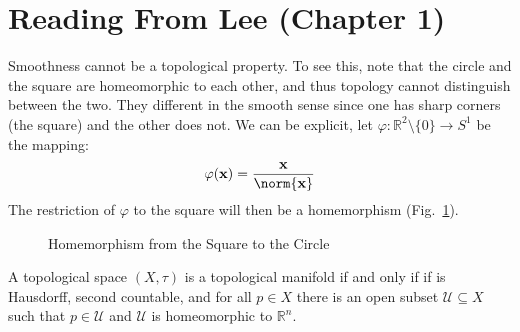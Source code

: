\section{Reading From Lee (Chapter 1)}
        Smoothness cannot be a topological property. To see this, note that the
        circle and the square are homeomorphic to each other, and thus topology
        cannot distinguish between the two. They different in the smooth sense
        since one has sharp corners (the square) and the other does not. We can
        be explicit, let
        $\varphi:\mathbb{R}^{2}\setminus\{0\}\rightarrow{S}^{1}$ be the mapping:
        \begin{equation}
            \varphi(\mathbf{x})=\frac{\mathbf{x}}{\norm{\mathbf{x}}}
        \end{equation}
        The restriction of $\varphi$ to the square will then be a homemorphism
        (Fig.~\ref{fig:Homeomorphism_Square_to_Circle}).
        \begin{figure}[H]
            \centering
            \captionsetup{type=figure}
            
            \caption{Homemorphism from the Square to the Circle}
            \label{fig:Homeomorphism_Square_to_Circle}
        \end{figure}
        \begin{theorem}
            A topological space $(X,\tau)$ is a topological manifold if and only
            if if is Hausdorff, second countable, and for all $p\in{X}$ there is
            an open subset $\mathcal{U}\subseteq{X}$ such that $p\in\mathcal{U}$
            and $\mathcal{U}$ is homeomorphic to $\mathbb{R}^{n}$.
        \end{theorem}
